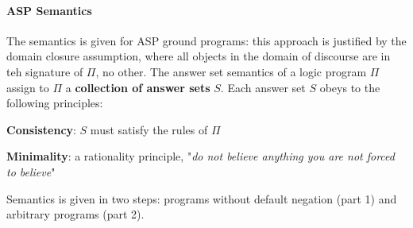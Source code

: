 \documentclass[10pt]{report}
\begin{document}
\paragraph{ASP Semantics} The semantics is given for ASP ground programs: this approach is justified by the domain closure assumption, where all objects in the domain of discourse are in teh signature of $\Pi$, no other. The answer set semantics of a logic program $\Pi$ assign to $\Pi$ a \textbf{collection of answer sets} $S$. Each answer set $S$ obeys to the following principles:\begin{list}{}{}
	\item \textbf{Consistency}: $S$ must satisfy the rules of $\Pi$
	\item \textbf{Minimality}: a rationality principle, "\textit{do not believe anything you are not forced to believe}"
\end{list}
Semantics is given in two steps: programs without default negation (part 1) and arbitrary programs (part 2).
\end{document}
